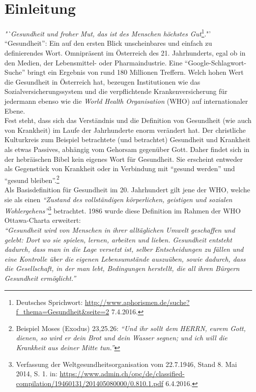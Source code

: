 \documentclass[
    a4paper,
    12pt,
    hyphens,
    chapterprefix=true,
    headheight=33pt,
    footheight=29pt,
    headings=optiontohead,
]{scrartcl}
\begin{document}
\section{Einleitung}

\textit{"`Gesundheit und froher Mut, das ist des Menschen höchstes Gut}\footnote{Deutsches Sprichwort: \url{http://www.aphorismen.de/suche?f_thema=Gesundheit&seite=2} 7.4.2016.}."'\\ "`Gesundheit"': Ein auf den ersten Blick unscheinbares und einfach zu definierendes Wort.
Omnipräsent im Österreich des 21. Jahrhunderts, egal ob in den Medien, der Lebensmittel- oder Pharmaindustrie. Eine "`Google-Schlagwort-Suche"' bringt ein Ergebnis von rund 180 Millionen Treffern. Welch hohen Wert die Gesundheit in Österreich hat, bezeugen Institutionen wie das Sozialversicherungssystem und die verpflichtende
Krankenversicherung für jedermann ebenso wie die \textit{World Health Organisation} (WHO) auf internationaler Ebene.\\
Fest steht, dass sich das Verständnis und die Definition von Gesundheit (wie auch von Krankheit) im Laufe der Jahrhunderte enorm verändert hat. Der christliche Kulturkreis zum Beispiel betrachtete (und betrachtet) Gesundheit und Krankheit als etwas Passives, abhängig vom Gehorsam gegenüber Gott. Daher findet sich in der hebräischen Bibel kein eigenes Wort für Gesundheit. Sie erscheint entweder als Gegenstück von Krankheit oder in Verbindung mit "`gesund werden"' und "`gesund bleiben"'.\footnote{Beispiel Moses (Exodus) 23,25.26: \textit{"`Und ihr sollt dem HERRN, eurem Gott, dienen, so wird er dein Brot und dein Wasser segnen; und ich will die Krankheit aus deiner Mitte tun."'}} \\
Als Basisdefinition für Gesundheit im 20. Jahrhundert gilt jene der WHO, welche sie als einen \textit{"`Zustand des vollständigen körperlichen, geistigen und sozialen Wohlergehens"'}\footnote{Verfassung der Weltgesundheitsorganisation vom 22.7.1946, Stand 8. Mai 2014,
S. 1. in: \url{https://www.admin.ch/opc/de/classified-compilation/19460131/201405080000/0.810.1.pdf} 6.4.2016.} betrachtet. 1986 wurde diese Definition im Rahmen der WHO Ottawa-Charta erweitert:\\
\textit{"`Gesundheit wird von Menschen in ihrer alltäglichen Umwelt geschaffen und gelebt: Dort wo sie spielen, lernen, arbeiten und lieben. Gesundheit entsteht dadurch, dass man in die Lage versetzt ist, selber Entscheidungen zu fällen und eine Kontrolle über die eigenen Lebensumstände auszuüben, sowie dadurch, dass die Gesellschaft, in
der man lebt, Bedingungen herstellt, die all ihren Bürgern Gesundheit ermöglicht."'}
\end{document}
